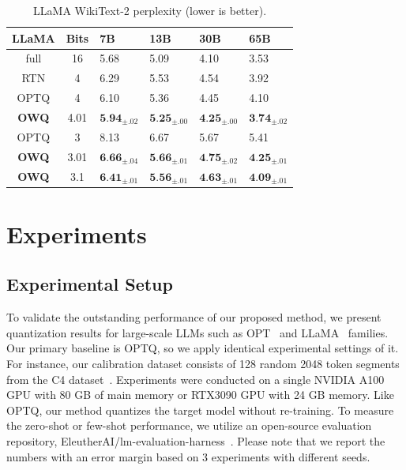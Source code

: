 \documentclass[letterpaper]{article} %
\begin{document}
\begin{table}[t]
        \centering
        \small
        \begin{tabular}{@{\hskip 0.08in} c @{\hskip 0.08in} | @{\hskip 0.08in} c @{\hskip 0.08in} | @{\hskip 0.15in} l @{\hskip 0.1in} l @{\hskip 0.1in} l @{\hskip 0.1in} l }
            \toprule
            LLaMA & Bits & 7B & 13B & 30B & 65B \\
            \midrule
            full & 16 & 5.68 & 5.09 & 4.10 & 3.53 \\
            \midrule
            RTN & 4 & 6.29 & 5.53 & 4.54 & 3.92 \\
            OPTQ & 4 & 6.10 & 5.36 & 4.45 & 4.10 \\
            \textbf{OWQ} & 4.01 & $\textbf{5.94}_{\pm.02}$ & $\textbf{5.25}_{\pm.00}$ & $\textbf{4.25}_{\pm.00}$ & $\textbf{3.74}_{\pm.02}$ \\
            \midrule
            OPTQ & 3 & 8.13 & 6.67 & 5.67 & 5.41 \\
            \textbf{OWQ} & 3.01 & $\textbf{6.66}_{\pm.04}$ & $\textbf{5.66}_{\pm.01}$ & $\textbf{4.75}_{\pm.02}$ & $\textbf{4.25}_{\pm.01}$ \\
            \textbf{OWQ} & 3.1 & $\textbf{6.41}_{\pm.01}$ & $\textbf{5.56}_{\pm.01}$ & $\textbf{4.63}_{\pm.01}$ & $\textbf{4.09}_{\pm.01}$ \\
            \bottomrule
        \end{tabular}
        \caption{LLaMA WikiText-2 perplexity (lower is better).}
        \label{table:llama_wiki}
\end{table}


\section{Experiments}
\label{experiments}
\subsection{Experimental Setup}
\label{experimental_setup}
To validate the outstanding performance of our proposed method, we present quantization results for large-scale LLMs such as OPT~\cite{zhang2022opt} and LLaMA~\cite{touvron2023llama} families. Our primary baseline is OPTQ, so we apply identical experimental settings of it. For instance, our calibration dataset consists of 128 random 2048 token segments from the C4 dataset~\cite{raffel2020exploring}. Experiments were conducted on a single NVIDIA A100 GPU with 80 GB of main memory or RTX3090 GPU with 24 GB memory. Like OPTQ, our method quantizes the target model without re-training.
To measure the zero-shot or few-shot performance, we utilize an open-source evaluation repository, EleutherAI/lm-evaluation-harness~\cite{eval-harness}. 
Please note that we report the numbers with an error margin based on 3 experiments with different seeds.
\end{document}
